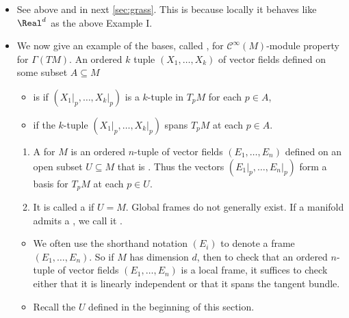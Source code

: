 \documentclass{article}
\begin{document}
\begin{enumerate}
\begin{itemize}
\item {} See above  and  in next \cref{sec:grass}. This is because locally it behaves like $\Real^d$ as the above Example I.
\item {}  We now give an example of the bases, called , for  $\mathcal{C}^\infty(M)$-module property for $\Gamma(TM)$. An ordered $k$ tuple $\left(X_1, \ldots, X_k\right)$ of vector fields defined on some subset $A \subseteq M$
\begin{itemize}[$\ast$]
    \item is  if $\left(\left.X_1\right|_p, \ldots,\left.X_k\right|_p\right)$ is a  $k$-tuple in $T_p M$ for each $p \in A$, 
    \item {} if the $k$-tuple $\left(\left.X_1\right|_p, \ldots,\left.X_k\right|_p\right)$ spans $T_p M$ at each $p \in A$.
\end{itemize}
\begin{enumerate}
    \item{} A  for $M$ is an ordered $n$-tuple of vector fields $\left(E_1, \ldots, E_n\right)$ defined on an open subset $U \subseteq M$ that is . Thus the vectors $\left(\left.E_1\right|_p, \ldots,\left.E_n\right|_p\right)$ form a basis for $T_p M$ at each $p \in U$. 
    \item {} It is called a  if $U=M$. Global frames do not generally exist. If a manifold admits a , we call it  . 
\end{enumerate}
\begin{itemize}[$\circ$]
    \item {} We often use the shorthand notation $\left(E_i\right)$ to denote a frame $\left(E_1, \ldots, E_n\right)$. {\tiny So if $M$ has dimension $d$, then to check that an ordered $n$-tuple of vector fields $\left(E_1, \ldots, E_n\right)$ is a local frame, it suffices to check either that it is linearly independent or that it spans the tangent bundle. }
\item {} Recall the  $U$ defined in the beginning of this section.  

\end{itemize}
\end{itemize}
\end{enumerate}
\end{document}
